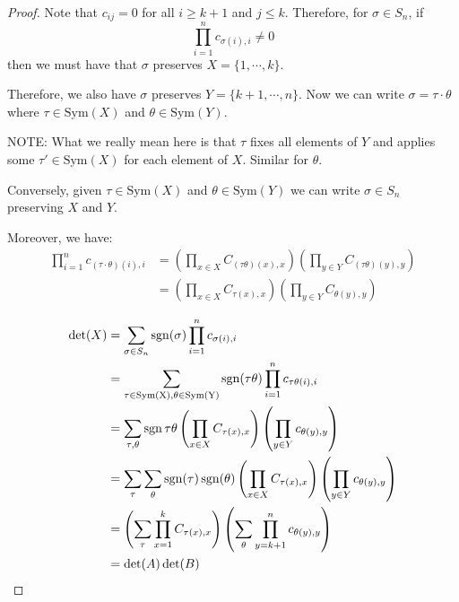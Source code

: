 \documentclass[../Main.tex]{subfiles}
\begin{document}
\begin{proof}
    Note that $c_{ij} = 0$ for all $i \geq k+1$ and $j \leq k$. Therefore, for $\sigma \in S_n$, if
    \begin{equation*}
        \prod_{i=1}^{n} c_{\sigma(i), i} \neq 0
    \end{equation*}
    then we must have that $\sigma$ preserves $X = \{1, \cdots, k\}$.

    Therefore, we also have $\sigma$ preserves $Y = \{k+1, \cdots, n\}$. Now we can write $\sigma = \tau \cdot \theta$ where $\tau \in \text{Sym}(X)$ and $\theta \in \text{Sym}(Y)$.

    NOTE: What we really mean here is that $\tau$ fixes all elements of $Y$ and applies some $\tau' \in \text{Sym}(X)$ for each element of $X$. Similar for $\theta$.

    Conversely, given $\tau \in \text{Sym}(X)$ and $\theta \in \text{Sym}(Y)$ we can write $\sigma \in S_n$ preserving $X$ and $Y$.

    Moreover, we have:
    \begin{align*}
        \prod_{i=1}^{n} c_{(\tau \cdot \theta)(i), i} &= \left(\prod_{x \in X} C_{(\tau \theta)(x), x}\right)\left(\prod_{y \in Y} C_{(\tau \theta)(y), y}\right) \\
        &= \left(\prod_{x \in X} C_{\tau(x), x}\right)\left(\prod_{y \in Y} C_{\theta(y), y}\right) \\
    \end{align*}
    \begin{align*}
        \det(X) &= \sum_{\sigma \in S_n} \operatorname{sgn}(\sigma) \prod_{i=1}^{n} c_{\sigma(i), i}\\
        &= \sum_{\tau \in \text{Sym(X)}, \theta \in \text{Sym(Y)}} \operatorname{sgn}(\tau\theta) \prod_{i=1}^{n} c_{\tau\theta(i), i} \\
        &= \sum_{\tau, \theta} \operatorname{sgn}{\tau\theta} \left(\prod_{x \in X}C_{\tau(x), x}\right)\left(\prod_{y\in Y} c_{\theta(y), y}\right) \\
        &= \sum_\tau \sum_\theta \operatorname{sgn}(\tau) \operatorname{sgn}(\theta) \left(\prod_{x \in X}C_{\tau(x), x}\right)\left(\prod_{y\in Y} c_{\theta(y), y}\right) \\
        &= \left(\sum_\tau \prod_{x=1}^kC_{\tau(x), x}\right)\left(\sum_\theta \prod_{y = k+1}^n c_{\theta(y), y}\right) \\
        &= \det(A) \det(B)
    \end{align*}
\end{proof}
\end{document}

